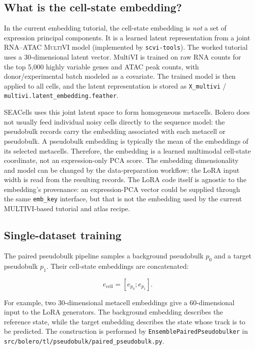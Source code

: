 \documentclass[11pt]{article}
\newcommand{\code}[1]{\texttt{\small #1}}
\newcommand{\condvec}{e}
\begin{document}
\subsection{What is the cell-state embedding?}

In the current embedding tutorial, the cell-state embedding is \emph{not} a set of
expression principal components. It is a learned latent representation from a joint
RNA--ATAC \textsc{MultiVI} model (implemented by \code{scvi-tools}). The worked tutorial
uses a 30-dimensional latent vector. MultiVI is trained on raw RNA counts for the top
5,000 highly variable genes and ATAC peak counts, with donor/experimental batch modeled as
a covariate. The trained model is then applied to all cells, and the latent representation
is stored as \code{X\_multivi} / \code{multivi.latent\_embedding.feather}.

SEACells uses this joint latent space to form homogeneous metacells. Bolero does not
usually feed individual noisy cells directly to the sequence model: the pseudobulk records
carry the embedding associated with each metacell or pseudobulk. A pseudobulk embedding is
typically the mean of the embeddings of its selected metacells. Therefore, the embedding
is a learned multimodal cell-state coordinate, not an expression-only PCA score. The
embedding dimensionality and model can be changed by the data-preparation workflow; the
LoRA input width is read from the resulting records.
The LoRA code itself is agnostic to the embedding's provenance: an expression-PCA vector
could be supplied through the same \code{emb\_key} interface, but that is not the embedding
used by the current MULTIVI-based tutorial and atlas recipe.

\subsection{Single-dataset training}

The paired pseudobulk pipeline samples a background pseudobulk $p_0$ and a target pseudobulk
$p_1$. Their cell-state embeddings are concatenated:

\[
\condvec_{\mathrm{cell}} = [\condvec_{p_0};\condvec_{p_1}].
\]

For example, two 30-dimensional metacell embeddings give a 60-dimensional input to the
LoRA generators. The background embedding describes the reference state, while the target
embedding describes the state whose track is to be predicted. The construction is performed
by \code{EnsemblePairedPseudobulker} in
\code{src/bolero/tl/pseudobulk/paired\_pseudobulk.py}.
\end{document}
